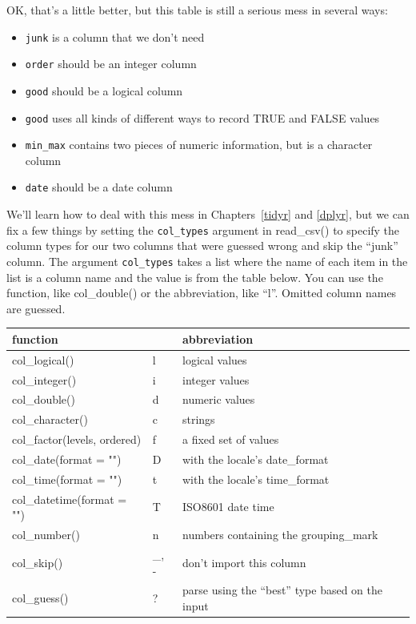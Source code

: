 \documentclass[
  oneside]{book}
\providecommand{\tightlist}{%
  \setlength{\itemsep}{0pt}\setlength{\parskip}{0pt}}
\begin{document}
OK, that's a little better, but this table is still a serious mess in several ways:

\begin{itemize}
\tightlist
\item
  \texttt{junk} is a column that we don't need
\item
  \texttt{order} should be an integer column
\item
  \texttt{good} should be a logical column
\item
  \texttt{good} uses all kinds of different ways to record TRUE and FALSE values
\item
  \texttt{min\_max} contains two pieces of numeric information, but is a character column
\item
  \texttt{date} should be a date column
\end{itemize}

We'll learn how to deal with this mess in Chapters~\ref{tidyr} and \ref{dplyr}, but we can fix a few things by setting the \texttt{col\_types} argument in {read\_csv}{(}{)} to specify the column types for our two columns that were guessed wrong and skip the ``junk'' column. The argument \texttt{col\_types} takes a list where the name of each item in the list is a column name and the value is from the table below. You can use the function, like {col\_double}{(}{)} or the abbreviation, like {``l''}. Omitted column names are guessed.

\begin{longtable}[]{@{}lll@{}}
\toprule
function & & abbreviation \\
\midrule
\endhead
col\_logical() & l & logical values \\
col\_integer() & i & integer values \\
col\_double() & d & numeric values \\
col\_character() & c & strings \\
col\_factor(levels, ordered) & f & a fixed set of values \\
col\_date(format = "") & D & with the locale's date\_format \\
col\_time(format = "") & t & with the locale's time\_format \\
col\_datetime(format = "") & T & ISO8601 date time \\
col\_number() & n & numbers containing the grouping\_mark \\
col\_skip() & \_, - & don't import this column \\
col\_guess() & ? & parse using the ``best'' type based on the input \\
\bottomrule
\end{longtable}
\end{document}
